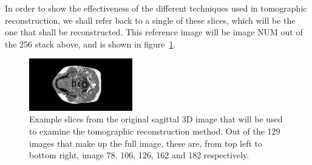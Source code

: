     In order to show the effectiveness of the different techniques used in tomographic reconstruction, we shall refer back to a single of these slices, which will be the one that shall be reconstructed. This reference image will be image NUM out of the 256 stack above, and is shown in figure~\ref{fig:reference_slice}.
    \begin{figure}[ht]
        \centering
        \includegraphics[width=0.4\textwidth]{Files/report_images/reference_slice.jpg}
        \caption{Example slices from the original sagittal 3D image that will be used to examine the tomographic reconstruction method. Out of the 129 images that make up the full image, these are, from top left to bottom right, image 78, 106, 126, 162 and 182 respectively.\label{fig:reference_slice}} 
    \end{figure}
    

